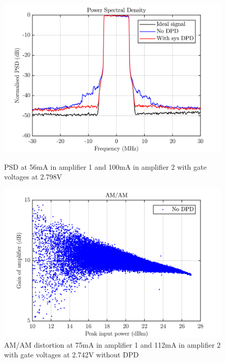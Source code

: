 \begin{figure}[H]
  \centering
  \begin{minipage}[b]{0.5\textwidth}
	\includegraphics[scale = 0.5]{figures/measurement/cree/meas5/psd_2p798v.png}
	\caption{PSD at 56mA in amplifier 1 and 100mA in amplifier 2 with gate voltages at 2.798V}	
    \label{fig:meas5_3}
  \end{minipage}
  \hfill
  \begin{minipage}[b]{0.4\textwidth}
	\includegraphics[scale = 0.5]{figures/measurement/cree/meas5/amam_no_dpd_2p742v.png}
	\caption{AM/AM distortion at 75mA in amplifier 1 and 112mA in amplifier 2 with gate voltages at 2.742V without DPD}
    \label{fig:meas5_4}
  \end{minipage}
\end{figure}

